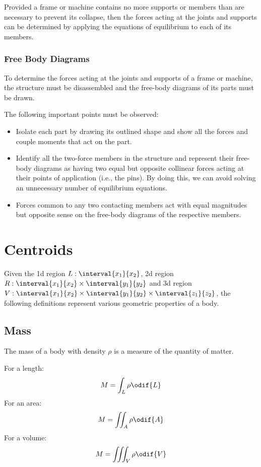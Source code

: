 \documentclass{article}
\begin{document}
Provided a frame or machine contains no more
supports or members than are necessary to prevent its collapse, then the
forces acting at the joints and supports can be determined by applying the
equations of equilibrium to each of its members.
\subsubsection{Free Body Diagrams}
To determine the forces acting at
the joints and supports of a frame or machine, the structure must be
disassembled and the free-body diagrams of its parts must be drawn.

The following important points must be observed:
\begin{itemize}
    \item Isolate each part by drawing its outlined shape and show all the
          forces and couple moments that act on the part.
    \item Identify all the two-force members in the structure and represent
          their free-body diagrams as having two equal but opposite collinear
          forces acting at their points of application (i.e., the pins). By doing
          this, we can avoid solving an unnecessary number of equilibrium
          equations.
    \item Forces common to any two contacting members act with equal
          magnitudes but opposite sense on the free-body diagrams of the
          respective members.
\end{itemize}
\section{Centroids}
Given the 1d region \(L:\interval{x_1}{x_2}\), 2d region \(R:\interval{x_1}{x_2}\times\interval{y_1}{y_2}\)
and 3d region \(V:\interval{x_1}{x_2}\times\interval{y_1}{y_2}\times\interval{z_1}{z_2}\),
the following definitions represent various geometric properties of a body.
\subsection{Mass}
The mass of a body with density \(\rho\) is a measure of the quantity of matter.

For a length:
\begin{equation*}
    M = \int_L \rho \odif{L}
\end{equation*}
For an area:
\begin{equation*}
    M = \iint_A \rho \odif{A}
\end{equation*}
For a volume:
\begin{equation*}
    M = \iiint_V \rho \odif{V}
\end{equation*}
\end{document}
